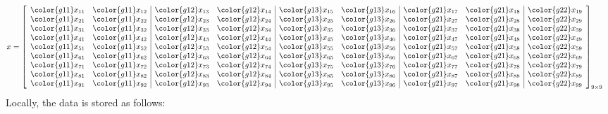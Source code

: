 \begin{align*}
x &= \left[
      \begin{array}{ll|ll|ll|ll|l}
      \color{g11}x_{11} & \color{g11}x_{12} & \color{g12}x_{13} & \color{g12}x_{14} & \color{g13}x_{15} & \color{g13}x_{16} & \color{g21}x_{17} & \color{g21}x_{18} & \color{g22}x_{19}\\
      \color{g11}x_{21} & \color{g11}x_{22} & \color{g12}x_{23} & \color{g12}x_{24} & \color{g13}x_{25} & \color{g13}x_{26} & \color{g21}x_{27} & \color{g21}x_{28} & \color{g22}x_{29}\\
      \color{g11}x_{31} & \color{g11}x_{32} & \color{g12}x_{33} & \color{g12}x_{34} & \color{g13}x_{35} & \color{g13}x_{36} & \color{g21}x_{37} & \color{g21}x_{38} & \color{g22}x_{39}\\
      \color{g11}x_{41} & \color{g11}x_{42} & \color{g12}x_{43} & \color{g12}x_{44} & \color{g13}x_{45} & \color{g13}x_{46} & \color{g21}x_{47} & \color{g21}x_{48} & \color{g22}x_{49}\\
      \color{g11}x_{51} & \color{g11}x_{52} & \color{g12}x_{53} & \color{g12}x_{54} & \color{g13}x_{55} & \color{g13}x_{56} & \color{g21}x_{57} & \color{g21}x_{58} & \color{g22}x_{59}\\
      \color{g11}x_{61} & \color{g11}x_{62} & \color{g12}x_{63} & \color{g12}x_{64} & \color{g13}x_{65} & \color{g13}x_{66} & \color{g21}x_{67} & \color{g21}x_{68} & \color{g22}x_{69}\\
      \color{g11}x_{71} & \color{g11}x_{72} & \color{g12}x_{73} & \color{g12}x_{74} & \color{g13}x_{75} & \color{g13}x_{76} & \color{g21}x_{77} & \color{g21}x_{78} & \color{g22}x_{79}\\
      \color{g11}x_{81} & \color{g11}x_{82} & \color{g12}x_{83} & \color{g12}x_{84} & \color{g13}x_{85} & \color{g13}x_{86} & \color{g21}x_{87} & \color{g21}x_{88} & \color{g22}x_{89}\\
      \color{g11}x_{91} & \color{g11}x_{92} & \color{g12}x_{93} & \color{g12}x_{94} & \color{g13}x_{95} & \color{g13}x_{96} & \color{g21}x_{97} & \color{g21}x_{98} & \color{g22}x_{99}\\
      \end{array}
\right]_{9\times 9}
\end{align*}
Locally, the data is stored as follows:
